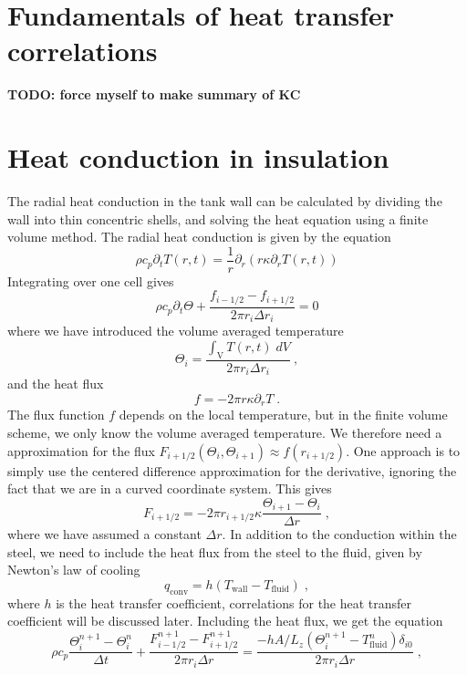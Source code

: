 \documentclass{article}
\begin{document}
\section{Fundamentals of heat transfer correlations}
\textbf{TODO: force myself to make summary of KC}
\section{Heat conduction in insulation}
The radial heat conduction in the tank wall can be calculated by dividing the wall into thin concentric shells, and solving the heat equation using a finite volume method. The radial heat conduction is given by the equation
\begin{equation}
    \rho c_{p} \partial_{t} T\left( r,t \right)
    = \frac{1}{r}\partial_{r} \left( r \kappa \partial_{r} T\left( r,t \right)
    \right)
    \label{eq:heat_equation}
\end{equation}
Integrating over one cell gives
\begin{equation}
    \rho c_{p} \partial_{t} \Theta + \frac{f_{i-1/2} - f_{i+1/2}}{2 \pi r_{i} \Delta r_{i}} = 0
\end{equation}
where we have introduced the volume averaged temperature
\begin{equation}
    \Theta_{i} = \frac{\int_{\text{V}}T\left(r,t\right)\;dV}{2 \pi r_{i} \Delta r_{i}}\:,
\end{equation}
and the heat flux
\begin{equation}
    f = - 2 \pi r \kappa \partial_{r} T\;.
\end{equation}
The flux function $f$ depends on the local temperature, but in the finite volume scheme, we only know the volume averaged temperature. We therefore need a approximation for the flux $F_{i+1/2}\left( \Theta_{i}, \Theta_{i+1} \right) \approx f\left( r_{i+1/2} \right)$. One approach is to simply use the centered difference approximation for the derivative, ignoring the fact that we are in a curved coordinate system. This gives
\begin{equation}
    F_{i+1/2} = - 2 \pi r_{i+1/2} \kappa \frac{\Theta_{i+1} - \Theta_{i}}{\Delta r}\;,
\end{equation}
where we have assumed a constant $\Delta r$. In addition to the conduction within the steel, we need to include the heat flux from the steel to the fluid, given by Newton's law of cooling
\begin{equation}
    q_{\text{conv}} = h\left( T_{\text{wall}} - T_{\text{fluid}} \right)\;,
\end{equation}
where $h$ is the heat transfer coefficient, correlations for the heat transfer coefficient will be discussed later. Including the heat flux, we get the equation
\begin{equation}
    \rho c_{p} \frac{\Theta_{i}^{n+1} - \Theta_{i}^{n}}{\Delta t} + \frac{F_{i-1/2}^{n+1} - F_{i+1/2}^{n+1}}{2 \pi r_{i} \Delta r} = \frac{- h A / L_{z} \left( \Theta_{i}^{n+1} - T_{\text{fluid}}^n \right) \delta_{i0} }{2 \pi r_{i} \Delta r}\;,
    \label{eq:heat_conduction}
\end{equation}
\end{document}
